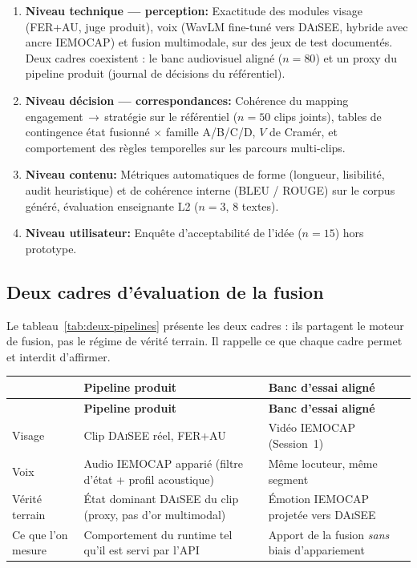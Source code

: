 \begin{enumerate}[leftmargin=1.4em]
  \item \textbf{Niveau technique --- perception:} Exactitude des modules
  visage (FER+AU, juge produit), voix (WavLM fine-tuné vers
  \textsc{DAiSEE}, hybride avec ancre \textsc{IEMOCAP}) et fusion
  multimodale, sur des jeux de test documentés. Deux cadres coexistent :
  le banc audiovisuel aligné ($n=80$) et un proxy du pipeline produit
  (journal de décisions du référentiel).

  \item \textbf{Niveau décision --- correspondances:} Cohérence du mapping
  engagement\,$\rightarrow$\,stratégie sur le référentiel ($n=50$ clips
  joints), tables de contingence état fusionné $\times$ famille A/B/C/D,
  $V$ de Cramér, et comportement des règles temporelles sur les parcours
  multi-clips.

  \item \textbf{Niveau contenu:} Métriques automatiques de forme
  (longueur, lisibilité, audit heuristique) et de cohérence interne
  (BLEU / ROUGE) sur le corpus généré, évaluation enseignante L2
  ($n=3$, 8 textes).

  \item \textbf{Niveau utilisateur:} Enquête d'acceptabilité de l'idée
  ($n=15$) hors prototype.
\end{enumerate}

\subsection{Deux cadres d'évaluation de la fusion}
\label{subsec:val-deux-cadres}

Le tableau~\ref{tab:deux-pipelines} présente les deux cadres : ils partagent
le moteur de fusion, pas le régime de vérité terrain. Il rappelle ce que
chaque cadre permet et interdit d'affirmer.

{\small
\renewcommand{\arraystretch}{1.18}
\setlength{\tabcolsep}{4pt}
\begin{xltabular}{\textwidth}{|>{\raggedright\arraybackslash}X|>{\raggedright\arraybackslash}X|>{\raggedright\arraybackslash}X|}
\hline
{}
 & \textbf{Pipeline produit} & \textbf{Banc d'essai aligné} \\
\hline
\endfirsthead
\hline
{}
 & \textbf{Pipeline produit} & \textbf{Banc d'essai aligné} \\
\hline
\endhead
\endfoot
\endlastfoot
Visage & Clip \textsc{DAiSEE} réel, FER+AU & Vidéo \textsc{IEMOCAP} (Session~1) \\
\hline
Voix & Audio \textsc{IEMOCAP} apparié (filtre d'état + profil acoustique) &
Même locuteur, même segment \\
\hline
Vérité terrain & État dominant \textsc{DAiSEE} du clip (proxy, pas d'or
multimodal) & Émotion \textsc{IEMOCAP} projetée vers \textsc{DAiSEE} \\
\hline
Ce que l'on mesure & Comportement du runtime tel qu'il est servi par l'API &
Apport de la fusion \emph{sans} biais d'appariement \\
\hline
\end{xltabular}
\label{tab:deux-pipelines}
}


